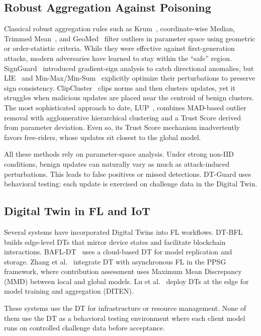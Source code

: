 \documentclass[conference]{IEEEtran}
\begin{document}
\subsection{Robust Aggregation Against Poisoning}

Classical robust aggregation rules such as Krum~\cite{blanchard2017machine}, coordinate-wise Median, Trimmed Mean~\cite{yin2018byzantine}, and GeoMed~\cite{pillutla2022robust} filter outliers in parameter space using geometric or order-statistic criteria. While they were effective against first-generation attacks, modern adversaries have learned to stay within the ``safe'' region. SignGuard~\cite{xu2022signguard} introduced gradient-sign analysis to catch directional anomalies, but LIE~\cite{baruch2019little} and Min-Max/Min-Sum~\cite{shejwalkar2021manipulating} explicitly optimize their perturbations to preserve sign consistency. ClipCluster~\cite{zeng2024clipcluster} clips norms and then clusters updates, yet it struggles when malicious updates are placed near the centroid of benign clusters. The most sophisticated approach to date, LUP~\cite{issa2025dtbfl}, combines MAD-based outlier removal with agglomerative hierarchical clustering and a Trust Score derived from parameter deviation. Even so, its Trust Score mechanism inadvertently favors free-riders, whose updates sit closest to the global model.

All these methods rely on parameter-space analysis. Under strong non-IID conditions, benign updates can naturally vary as much as attack-induced perturbations. This leads to false positives or missed detections. DT-Guard uses behavioral testing: each update is exercised on challenge data in the Digital Twin.

\subsection{Digital Twin in FL and IoT}

Several systems have incorporated Digital Twins into FL workflows. DT-BFL~\cite{issa2025dtbfl} builds edge-level DTs that mirror device states and facilitate blockchain interactions. BAFL-DT~\cite{qu2021bafldt} uses a cloud-based DT for model replication and storage. Zhang et al.~\cite{zhang2025ppsg} integrate DT with asynchronous FL in the PPSG framework, where contribution assessment uses Maximum Mean Discrepancy (MMD) between local and global models. Lu et al.~\cite{lu2020diten} deploy DTs at the edge for model training and aggregation (DITEN).

These systems use the DT for infrastructure or resource management. None of them use the DT as a behavioral testing environment where each client model runs on controlled challenge data before acceptance.
\end{document}
